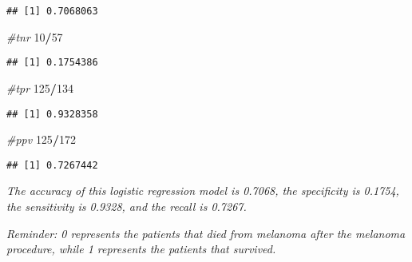 \documentclass[]{article}
\newenvironment{Shaded}{\begin{snugshade}}{\end{snugshade}}
\newcommand{\CommentTok}[1]{\textcolor[rgb]{0.56,0.35,0.01}{\textit{#1}}}
\newcommand{\DecValTok}[1]{\textcolor[rgb]{0.00,0.00,0.81}{#1}}
\newcommand{\OperatorTok}[1]{\textcolor[rgb]{0.81,0.36,0.00}{\textbf{#1}}}
\begin{document}
\begin{verbatim}
## [1] 0.7068063
\end{verbatim}

\begin{Shaded}
\begin{Highlighting}[]
\CommentTok{#tnr}
\DecValTok{10}\OperatorTok{/}\DecValTok{57}
\end{Highlighting}
\end{Shaded}

\begin{verbatim}
## [1] 0.1754386
\end{verbatim}

\begin{Shaded}
\begin{Highlighting}[]
\CommentTok{#tpr}
\DecValTok{125}\OperatorTok{/}\DecValTok{134}
\end{Highlighting}
\end{Shaded}

\begin{verbatim}
## [1] 0.9328358
\end{verbatim}

\begin{Shaded}
\begin{Highlighting}[]
\CommentTok{#ppv}
\DecValTok{125}\OperatorTok{/}\DecValTok{172}
\end{Highlighting}
\end{Shaded}

\begin{verbatim}
## [1] 0.7267442
\end{verbatim}

\emph{The accuracy of this logistic regression model is 0.7068, the
specificity is 0.1754, the sensitivity is 0.9328, and the recall is
0.7267.}

\begin{Shaded}
\end{Shaded}

\emph{Reminder: 0 represents the patients that died from melanoma after
the melanoma procedure, while 1 represents the patients that survived.}
\end{document}
